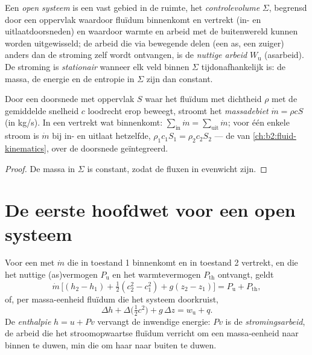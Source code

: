 \begin{definition}\label{def:b2:open-systems:cv}
Een \emph{open systeem} is een vast gebied in de ruimte,
het \emph{controlevolume} $\Sigma$, begrensd door een
oppervlak waardoor fluïdum binnenkomt en vertrekt (in- en uitlaatdoorsneden)
en waardoor warmte en arbeid met de buitenwereld kunnen worden uitgewisseld;
de arbeid die via bewegende delen (een as, een zuiger) anders dan de stroming
zelf wordt ontvangen, is de \emph{nuttige arbeid}
$W_{\text{u}}$ (asarbeid). De stroming is \emph{stationair} wanneer elk veld binnen $\Sigma$ tijdonafhankelijk is: de massa,
de energie en de entropie in $\Sigma$ zijn dan constant.
\end{definition}

\begin{proposition}[Massabalans]\label{prop:b2:open-systems:mass}
Door een doorsnede met oppervlak $S$ waar het fluïdum met dichtheid $\rho$
met de gemiddelde snelheid $c$ loodrecht erop beweegt, stroomt het
\emph{massadebiet} $\dot m = \rho c S$ (in
\unit{kg/s}). In een
 vertrekt wat binnenkomt:
$\sum_{\text{in}}\dot m = \sum_{\text{uit}}
\dot m$; voor één enkele stroom
is $\dot m$ bij in- en uitlaat hetzelfde,
$\rho_1c_1S_1 = \rho_2c_2S_2$ --- de  van
\cref{ch:b2:fluid-kinematics}, over de doorsnede geïntegreerd.
\end{proposition}

\begin{proof}
De massa in $\Sigma$ is constant, zodat de fluxen in evenwicht zijn.
\end{proof}

\section{De eerste hoofdwet voor een open systeem}

\begin{theorem}\label{thm:b2:open-systems:firstlaw}
Voor een  met  $\dot m$ die in toestand 1
binnenkomt en in toestand 2 vertrekt, en die het nuttige (as)vermogen
$P_{\text{u}}$ en het warmtevermogen $P_{\text{th}}$ ontvangt, geldt
\[
\dot m\,\Big[(h_2 - h_1) + \tfrac12(c_2^2 - c_1^2) + g(z_2 - z_1)\Big]
= P_{\text{u}} + P_{\text{th}} ,
\]
of, per massa-eenheid fluïdum die het systeem doorkruist,
\[
\Delta h + \Delta\big(\tfrac12c^2\big) + g\,\Delta z = w_{\text{u}} + q .
\]
De \emph{enthalpie} $h = u + Pv$ vervangt
de inwendige energie: $Pv$ is de \emph{stromingsarbeid}, de arbeid die het
stroomopwaartse fluïdum verricht om een massa-eenheid naar binnen te duwen, min die
om haar naar buiten te duwen.
\end{theorem}

